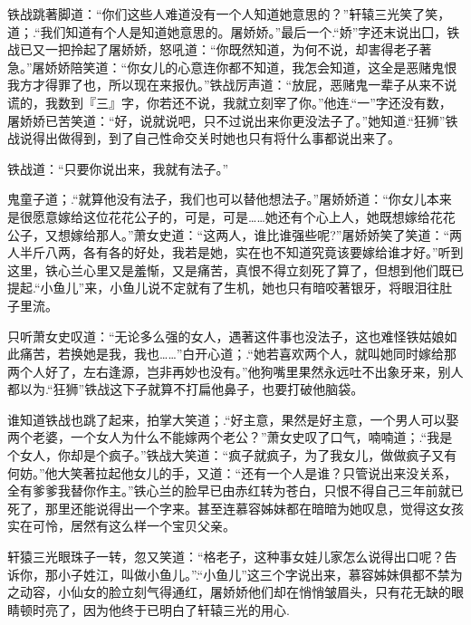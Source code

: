 \documentclass[12pt,oneside]{book}
\begin{document}
铁战跳著脚道：``你们这些人难道没有一个人知道她意思的？''轩辕三光笑了笑，道；.``我们知道有个人是知道她意思的。屠娇娇。''最后一个.``娇''字还末说出囗，铁战已又一把拎起了屠娇娇，怒吼道：``你既然知道，为何不说，却害得老子著急。''屠娇娇陪笑道：``你女儿的心意连你都不知道，我怎会知道，这全是恶赌鬼恨我方才得罪了也，所以现在来报仇。''铁战厉声道：``放屁，恶赌鬼一辈子从来不说谎的，我数到『三』字，你若还不说，我就立刻宰了你。''他连.``一''字还没有数，屠娇娇已苦笑道：``好，说就说吧，只不过说出来你更没法子了。''她知道.``狂狮''铁战说得出做得到，到了自己性命交关时她也只有将什么事都说出来了。

铁战道：``只要你说出来，我就有法子。''

鬼童子道；.``就算他没有法子，我们也可以替他想法子。''屠娇娇道：``你女儿本来是很愿意嫁给这位花花公子的，可是，可是\ldots\ldots 她还有个心上人，她既想嫁给花花公子，又想嫁给那人。''萧女史道：``这两人，谁比谁强些呢?''屠娇娇笑了笑道：``两人半斤八两，各有各的好处，我若是她，实在也不知道究竟该要嫁给谁才好。''听到这里，铁心兰心里又是羞惭，又是痛苦，真恨不得立刻死了算了，但想到他们既已提起.``小鱼儿''来，小鱼儿说不定就有了生机，她也只有暗咬著银牙，将眼泪往肚子里流。

只听萧女史叹道：``无论多么强的女人，遇著这件事也没法子，这也难怪铁姑娘如此痛苦，若换她是我，我也\ldots\ldots{}''白开心道；.``她若喜欢两个人，就叫她同时嫁给那两个人好了，左右逢源，岂非再妙也没有。''他狗嘴里果然永远吐不出象牙来，别人都以为.``狂狮''铁战这下子就算不打扁他鼻子，也要打破他脑袋。

谁知道铁战也跳了起来，拍掌大笑道；.``好主意，果然是好主意，一个男人可以娶两个老婆，一个女人为什么不能嫁两个老公？''萧女史叹了口气，喃喃道；.``我是个女人，你却是个疯子。''铁战大笑道：``疯子就疯子，为了我女儿，做做疯子又有何妨。''他大笑著拉起他女儿的手，又道：``还有一个人是谁？只管说出来没关系，全有爹爹我替你作主。''铁心兰的脸早已由赤红转为苍白，只恨不得自己三年前就已死了，那里还能说得出一个字来。甚至连慕容姊妹都在暗暗为她叹息，觉得这女孩实在可怜，居然有这么样一个宝贝父亲。

轩猿三光眼珠子一转，忽又笑道：``格老子，这种事女娃儿家怎么说得出口呢？告诉你，那小子姓江，叫做小鱼儿。''.``小鱼儿''这三个字说出来，慕容姊妹俱都不禁为之动容，小仙女的脸立刻气得通红，屠娇娇他们却在悄悄皱眉头，只有花无缺的眼睛顿时亮了，因为他终于已明白了轩辕三光的用心.
\end{document}
